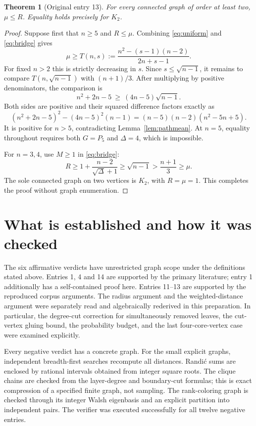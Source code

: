 \documentclass[11pt,a4paper]{article}
\newtheorem{theorem}{Theorem}[section]
\theoremstyle{remark}\newtheorem{remark}[theorem]{Remark}
\begin{document}
\begin{theorem}[Original entry 13]\label{thm:meanrandic}
For every connected graph of order at least two, $\mu\le R$.
Equality holds precisely for $K_2$.
\end{theorem}
\begin{proof}
Suppose first that $n\ge5$ and $R\le\mu$. Combining
\eqref{eq:uniform} and \eqref{eq:bridge} gives
\[
 \mu\ge T(n,s):=\frac{n^2-(s-1)(n-2)}{2n+s-1}.
\]
For fixed $n>2$ this is strictly decreasing in $s$. Since
$s\le\sqrt{n-1}$, it remains to compare $T(n,\sqrt{n-1})$ with
$(n+1)/3$. After multiplying by positive denominators, the comparison is
\[
 n^2+2n-5\ \ge\ (4n-5)\sqrt{n-1}.
\]
Both sides are positive and their squared difference factors exactly as
\[
 (n^2+2n-5)^2-(4n-5)^2(n-1)
 =(n-5)(n-2)(n^2-5n+5).
\]
It is positive for $n>5$, contradicting Lemma~\ref{lem:pathmean}.
At $n=5$, equality throughout requires both $G=P_5$ and $\Delta=4$,
which is impossible.

For $n=3,4$, use $M\ge1$ in \eqref{eq:bridge}:
\[
 R\ge1+\frac{n-2}{\sqrt\Delta+1}
   \ge\sqrt{n-1}>\frac{n+1}{3}\ge\mu.
\]
The sole connected graph on two vertices is $K_2$, with $R=\mu=1$.
This completes the proof without graph enumeration.
\end{proof}

\section{What is established and how it was checked}\label{sec:verification}
The six affirmative verdicts have unrestricted graph scope under the
definitions stated above. Entries 1, 4 and 14 are supported by the primary
literature; entry 1 additionally has a self-contained proof here. Entries
11--13 are supported by the reproduced corpus arguments. The radius argument
and the weighted-distance argument were separately read and algebraically
rederived in this preparation. In particular, the degree-cut correction for
simultaneously removed leaves, the cut-vertex gluing bound, the probability
budget, and the last four-core-vertex case were examined explicitly.

Every negative verdict has a concrete graph. For the small explicit graphs,
independent breadth-first searches recompute all distances. Randi\'c sums
are enclosed by rational intervals obtained from integer square roots.
The clique chains are checked from the layer-degree and boundary-cut formulas;
this is exact compression of a specified finite graph, not sampling. The
rank-coloring graph is checked through its integer Walsh eigenbasis and
an explicit partition into independent pairs. The verifier was executed
successfully for all twelve negative entries.
\end{document}
